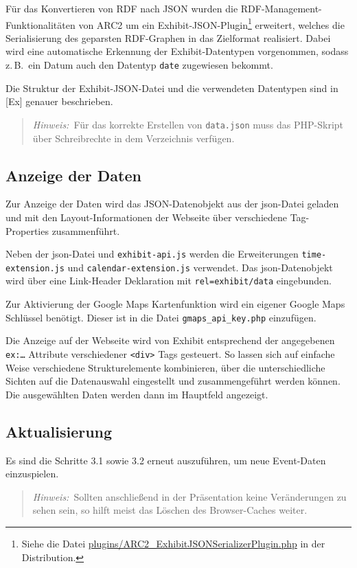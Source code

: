 \documentclass[11pt,a4paper]{article}
\begin{document}
Für das Konvertieren von RDF nach JSON wurden die
RDF-Management-Funktionalitäten von ARC2 um ein
Exhibit-JSON-Plugin\footnote{Siehe die Datei
  \url{plugins/ARC2_ExhibitJSONSerializerPlugin.php} in der Distribution.}
erweitert, welches die Serialisierung des geparsten RDF-Graphen in das
Zielformat realisiert.  Dabei wird eine automatische Erkennung der
Exhibit-Datentypen vorgenommen, sodass z.\,B.\ ein Datum auch den Datentyp
\texttt{date} zugewiesen bekommt.

Die Struktur der Exhibit-JSON-Datei und die verwendeten Datentypen sind in
[Ex] genauer beschrieben.
\begin{quote}
  \emph{Hinweis:}\ Für das korrekte Erstellen von \texttt{data.json} muss das
  PHP-Skript über {Schreibrechte} in dem Verzeichnis verfügen.
\end{quote}

\subsection{Anzeige der Daten}

Zur Anzeige der Daten wird das JSON-Datenobjekt aus der json-Datei geladen und
mit den Layout-Informationen der Webseite über verschiedene Tag-Properties
zusammenführt.

Neben der json-Datei und \texttt{exhibit-api.js} werden die Erweiterungen
\texttt{time-extension.js} und \texttt{calendar-extension.js} verwendet.
Das json-Datenobjekt wird über eine Link-Header Deklaration mit
\texttt{rel={\dq}exhibit/data{\dq}} eingebunden. 

Zur Aktivierung der Google Maps Kartenfunktion wird ein eigener Google Maps
Schlüssel benötigt. Dieser ist in die Datei \texttt{gmaps\_api\_key.php}
einzufügen.

Die Anzeige auf der Webseite wird von Exhibit entsprechend der angegebenen
\texttt{ex:\ldots} Attribute verschiedener \texttt{<div>} Tags gesteuert.  So
lassen sich auf einfache Weise verschiedene Strukturelemente kombinieren, über
die unterschiedliche Sichten auf die Datenauswahl eingestellt und
zusammengeführt werden können.  Die ausgewählten Daten werden dann im
Hauptfeld angezeigt.

\subsection{Aktualisierung}
Es sind die Schritte 3.1 sowie 3.2 erneut auszuführen, um neue Event-Daten
einzuspielen.
\begin{quote}
  \emph{Hinweis:}\ Sollten anschließend in der Präsentation keine
  Veränderungen zu sehen sein, so hilft meist das {Löschen des Browser-Caches}
  weiter.
\end{quote}
\end{document}
